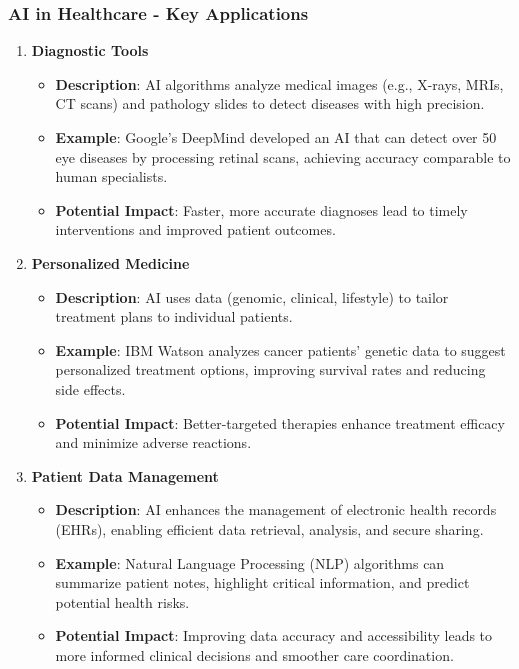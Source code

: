 \documentclass{beamer}
\begin{document}
\begin{frame}[fragile]
    \frametitle{AI in Healthcare - Key Applications}
    \begin{enumerate}
        \item \textbf{Diagnostic Tools}
            \begin{itemize}
                \item \textbf{Description}: AI algorithms analyze medical images (e.g., X-rays, MRIs, CT scans) and pathology slides to detect diseases with high precision.
                \item \textbf{Example}: Google’s DeepMind developed an AI that can detect over 50 eye diseases by processing retinal scans, achieving accuracy comparable to human specialists.
                \item \textbf{Potential Impact}: Faster, more accurate diagnoses lead to timely interventions and improved patient outcomes.
            \end{itemize}
            
        \item \textbf{Personalized Medicine}
            \begin{itemize}
                \item \textbf{Description}: AI uses data (genomic, clinical, lifestyle) to tailor treatment plans to individual patients.
                \item \textbf{Example}: IBM Watson analyzes cancer patients' genetic data to suggest personalized treatment options, improving survival rates and reducing side effects.
                \item \textbf{Potential Impact}: Better-targeted therapies enhance treatment efficacy and minimize adverse reactions.
            \end{itemize}
            
        \item \textbf{Patient Data Management}
            \begin{itemize}
                \item \textbf{Description}: AI enhances the management of electronic health records (EHRs), enabling efficient data retrieval, analysis, and secure sharing.
                \item \textbf{Example}: Natural Language Processing (NLP) algorithms can summarize patient notes, highlight critical information, and predict potential health risks.
                \item \textbf{Potential Impact}: Improving data accuracy and accessibility leads to more informed clinical decisions and smoother care coordination.
            \end{itemize}
    \end{enumerate}
\end{frame}
\end{document}
